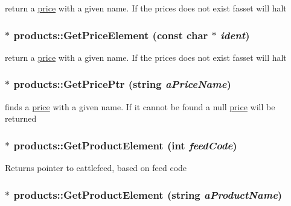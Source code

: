 \label{classproducts_a3a34b70e01258e1a19d8c68010c41d83}
return a \hyperlink{classprice}{price} with a given name. If the prices does not exist fasset will halt \hypertarget{classproducts_a33388ac3221fd6116d2dae25543685c1}{
\subsubsection[{GetPriceElement}]{ $\ast$ products::GetPriceElement (const char $\ast$ {\em ident})}}
\label{classproducts_a33388ac3221fd6116d2dae25543685c1}
return a \hyperlink{classprice}{price} with a given name. If the prices does not exist fasset will halt \hypertarget{classproducts_aa31314fc97c7604a5e092022053e5543}{
\subsubsection[{GetPricePtr}]{ $\ast$ products::GetPricePtr (string {\em aPriceName})}}
\label{classproducts_aa31314fc97c7604a5e092022053e5543}
finds a \hyperlink{classprice}{price} with a given name. If it cannot be found a null \hyperlink{classprice}{price} will be returned \hypertarget{classproducts_a0236cbb567600326e95e323e39066190}{
\subsubsection[{GetProductElement}]{ $\ast$ products::GetProductElement (int {\em feedCode})}}
\label{classproducts_a0236cbb567600326e95e323e39066190}
Returns pointer to cattlefeed, based on feed code \hypertarget{classproducts_aab404bf964b8ae9272a30710a953e9c0}{
\subsubsection[{GetProductElement}]{ $\ast$ products::GetProductElement (string {\em aProductName})}}
\label{classproducts_aab404bf964b8ae9272a30710a953e9c0}
